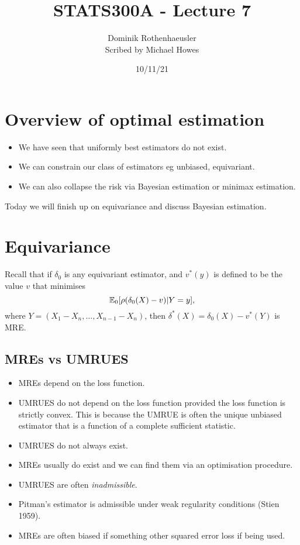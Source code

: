 




\title{STATS300A - Lecture 7}
\author{Dominik Rothenhaeusler\\ Scribed by Michael Howes}
\date{10/11/21}

\pagestyle{fancy}
\fancyhf{}


\maketitle
\tableofcontents
\section{Overview of optimal estimation}
\begin{itemize}
    \item We have seen that uniformly best estimators do not exist.
    \item We can constrain our class of estimators eg unbiased, equivariant.
    \item We can also collapse the risk via Bayesian estimation or minimax estimation.
\end{itemize}
Today we will finish up on equivariance and discuss Bayesian estimation.
\section{Equivariance}
Recall that if $\delta_0$ is any equivariant estimator, and $v^*(y)$ is defined to be the value $v$ that minimises
\[{\mathbb{E}}_0[\rho(\delta_0(X)-v)|Y=y], \]
where $Y=(X_1-X_n,\ldots,X_{n-1}-X_n)$, then $\delta^*(X) = \delta_0(X) - v^*(Y)$ is MRE.
\subsection{MREs vs UMRUES}
\begin{itemize}
    \item MREs depend on the loss function.
    \item UMRUES do not depend on the loss function provided the loss function is strictly convex. This is because the UMRUE is often the unique unbiased estimator that is a function of a complete sufficient statistic.
    \item UMRUES do not always exist.
    \item MREs usually do exist and we can find them via an optimisation procedure.
    \item UMRUES are often \emph{inadmissible}.
    \item Pitman's estimator is admissible under weak regularity conditions (Stien 1959).
    \item MREs are often biased if something other squared error loss if being used.
\end{itemize}
